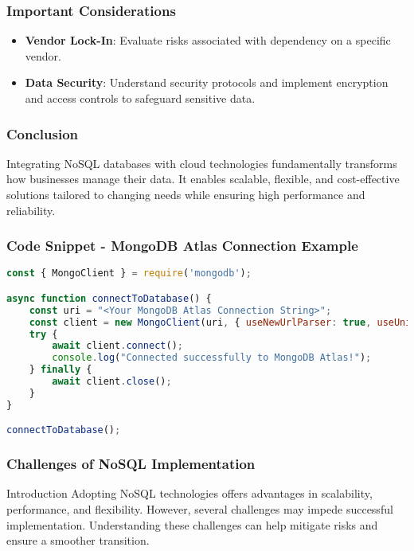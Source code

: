 \documentclass[aspectratio=169]{beamer}
\begin{document}
\begin{frame}
    \frametitle{Important Considerations}
    \begin{itemize}
        \item \textbf{Vendor Lock-In}: Evaluate risks associated with dependency on a specific vendor.
        \item \textbf{Data Security}: Understand security protocols and implement encryption and access controls to safeguard sensitive data.
    \end{itemize}
\end{frame}

\begin{frame}
    \frametitle{Conclusion}
    Integrating NoSQL databases with cloud technologies fundamentally transforms how businesses manage their data. It enables scalable, flexible, and cost-effective solutions tailored to changing needs while ensuring high performance and reliability.
\end{frame}

\begin{frame}[fragile]
    \frametitle{Code Snippet - MongoDB Atlas Connection Example}
    \begin{lstlisting}[language=JavaScript]
const { MongoClient } = require('mongodb');

async function connectToDatabase() {
    const uri = "<Your MongoDB Atlas Connection String>";
    const client = new MongoClient(uri, { useNewUrlParser: true, useUnifiedTopology: true });
    try {
        await client.connect();
        console.log("Connected successfully to MongoDB Atlas!");
    } finally {
        await client.close();
    }
}

connectToDatabase();
    \end{lstlisting}
\end{frame}

\begin{frame}[fragile]
    \frametitle{Challenges of NoSQL Implementation}
    \begin{block}{Introduction}
        Adopting NoSQL technologies offers advantages in scalability, performance, and flexibility.
        However, several challenges may impede successful implementation. 
        Understanding these challenges can help mitigate risks and ensure a smoother transition.
    \end{block}
\end{frame}
\end{document}
